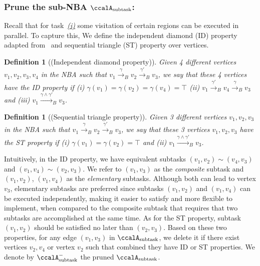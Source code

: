 \documentclass[Afour,sageh,times]{sagej}
\newtheorem{defn}[thm]{Definition}
\newcommand{\auto}[1]{\ccalA_{\textup{#1}}}
\begin{document}
  \subsubsection{Prune the sub-NBA \upshape $\auto{subtask}$:} \label{sub-NBA:2}
Recall that for task~\hyperref[task:i]{\it (i)}  some visitation of certain regions can be executed in parallel. To capture this, We define the independent diamond (ID) property adapted from~\cite{stefanescu2006automatic}  and sequential triangle (ST) property over vertices.
\begin{defn}[(Independent diamond property)]\label{defn:id}
Given 4 different vertices $v_1, v_2, v_3, v_4$ in the NBA such that $v_1 \xrightarrow{\gamma}_B v_2 \xrightarrow{\gamma'}_B v_3$, we say that these 4 vertices have the ID property if {\it (i)} $\gamma(v_1) = \gamma(v_2) = \gamma(v_4) = \top$  {\it (ii)} $v_1 \xrightarrow{\gamma'}_B v_4 \xrightarrow{\gamma}_B v_3$ and (iii) $v_1 \xrightarrow{\gamma \wedge \gamma'}_B v_3$.
\end{defn}
\begin{defn}[(Sequential triangle property)]
  Given 3 different vertices $v_1, v_2, v_3$ in the NBA such that $v_1 \xrightarrow{\gamma}_B v_2 \xrightarrow{\gamma'}_B v_3$, we say that these 3 vertices $v_1, v_2, v_3$ have the ST property if {\it (i)} $\gamma(v_1) = \gamma(v_2) = \top$  and {\it (ii)} $v_1 \xrightarrow{\gamma \wedge \gamma'}_B v_3$.
\end{defn}

Intuitively, in the ID property, we have equivalent subtasks $(v_1, v_2) \sim (v_4, v_3)$ and $(v_1, v_4) \sim (v_2, v_3)$. We refer to $(v_1, v_3)$ as the {\it composite} subtask and $(v_1, v_2)$, $(v_1, v_4)$ as the {\it elementary} subtasks.  Although both can lead to vertex $v_3$, elementary subtasks are preferred since subtasks $(v_1, v_2)$ and $(v_1, v_4)$ can be executed independently, making it easier to satisfy and more flexible to implement, when  compared to the composite subtask that requires that two subtasks are accomplished at the same time. As for the ST property, subtask $(v_1, v_2)$ should be satisfied no later than $(v_2, v_3)$. Based on these two properties, for any edge $(v_1, v_3)$ in $\auto{subtask}$, we delete it if there exist vertices $v_2, v_4$ or vertex $v_2$ such that combined they have ID or ST properties. We denote by $\auto{subtask}^-$ the pruned $\auto{subtask}$.
\end{document}
